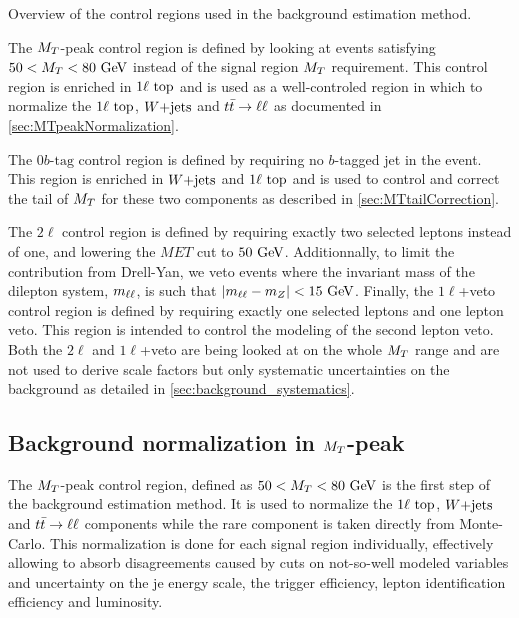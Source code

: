                          {Overview of the control regions used in the background estimation method.}

        The $M_T$-peak control region is defined by looking at events satisfying $50 < M_T < 80 ~\text{GeV}$
        instead of the signal region $M_T$ requirement. This control region is enriched in $1\ell~\text{top}$
        and is used as a well-controled region in which to normalize the $1\ell~\text{top}$, $\text{$W$+jets}$ 
        and $t\bar{t} \rightarrow \ell \ell$ as documented in \ref{sec:MTpeakNormalization}.
        
        The $0b\text{-tag}$ control region is defined by requiring no $b$-tagged jet in the event.
        This region is enriched in $\text{$W$+jets}$ and $1\ell~\text{top}$ and is used to control and correct 
        the tail of $M_T$ for these two components as described in \ref{sec:MTtailCorrection}.

        The $2\ell$ control region is defined by requiring exactly two selected leptons instead of
        one, and lowering the $MET$ cut to $50 ~\text{GeV}$. Additionnally, to limit the contribution
        from Drell-Yan, we veto events where the invariant mass of the dilepton system, $m_{\ell\ell}$,
        is such that $\left|m_{\ell\ell} - m_{Z}\right| < 15 ~\text{GeV}$. Finally, the $1\ell$+veto control 
        region is defined by requiring exactly one selected leptons and one lepton veto. This region 
        is intended to control the modeling of the second lepton veto. Both the $2\ell$ and $1\ell$+veto
        are being looked at on the whole $M_T$ range and are not used to derive scale factors but only 
        systematic uncertainties on the background as detailed in \ref{sec:background_systematics}.


        \subsection{Background normalization in $M_T$-peak \label{sec:MTpeakNormalization}}

            The $M_T$-peak control region, defined as $50 < M_T < 80 ~\text{GeV}$ is the first step of the
            background estimation method. It is used to normalize the $1\ell~\text{top}$, $\text{$W$+jets}$ and
            $t\bar{t} \rightarrow \ell \ell$ components while the rare component is taken directly from Monte-Carlo.
            This normalization is done for each signal region individually, effectively allowing to
            absorb disagreements caused by cuts on not-so-well modeled variables and uncertainty on the
            je energy scale, the trigger efficiency, lepton identification efficiency and luminosity.

